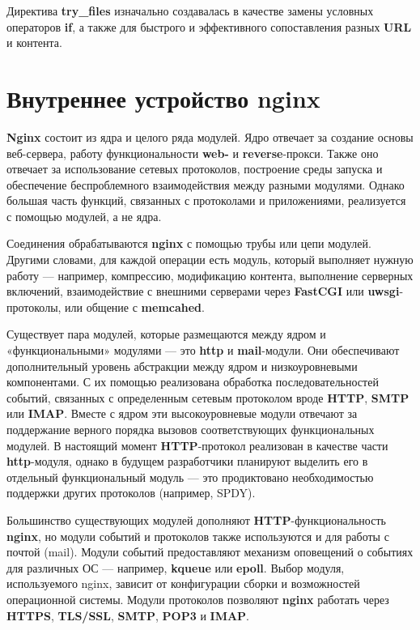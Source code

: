 \documentclass[14pt, a4paper]{article}
\begin{document}
Директива \textbf{try\_files} изначально создавалась в качестве замены условных операторов \textbf{if}, а также для 
быстрого и эффективного сопоставления разных \textbf{URL} и контента.

\section*{Внутреннее устройство nginx}
\textbf{Nginx} состоит из ядра и целого ряда модулей. Ядро отвечает за создание основы веб-сервера, 
работу функциональности \textbf{web-} и \textbf{reverse}-прокси. Также оно отвечает за использование сетевых 
протоколов, построение среды запуска и обеспечение беспроблемного взаимодействия между разными 
модулями. Однако большая часть функций, связанных с протоколами и приложениями, реализуется с 
помощью модулей, а не ядра.

Соединения обрабатываются \textbf{nginx} с помощью трубы или цепи модулей. Другими словами, для 
каждой операции есть модуль, который выполняет нужную работу — например, компрессию, 
модификацию контента, выполнение серверных включений, взаимодействие с внешними серверами 
через \textbf{FastCGI} или \textbf{uwsgi}-протоколы, или общение с \textbf{memcahed}.

Существует пара модулей, которые размещаются между ядром и «функциональными» модулями — это 
\textbf{http} и \textbf{mail}-модули. Они обеспечивают дополнительный уровень абстракции между ядром и 
низкоуровневыми компонентами. С их помощью реализована обработка последовательностей 
событий, связанных с определенным сетевым протоколом вроде \textbf{HTTP}, \textbf{SMTP} или \textbf{IMAP}. Вместе 
с ядром эти высокоуровневые модули отвечают за поддержание верного порядка вызовов 
соответствующих функциональных модулей. В настоящий момент \textbf{HTTP}-протокол реализован 
в качестве части \textbf{http}-модуля, однако в будущем разработчики планируют выделить его в 
отдельный функциональный модуль — это продиктовано необходимостью поддержки других протоколов (например, SPDY).

Большинство существующих модулей дополняют \linebreak\textbf{HTTP}-функциональность \textbf{nginx}, но модули событий и 
протоколов также используются и для работы с почтой (mail). Модули событий предоставляют 
механизм оповещений о событиях для различных ОС — например, \textbf{kqueue} или \textbf{epoll}. Выбор модуля, 
используемого nginx, зависит от конфигурации сборки и возможностей операционной системы. 
Модули протоколов позволяют \textbf{nginx} работать через \textbf{HTTPS}, \textbf{TLS/SSL}, 
\textbf{SMTP}, \textbf{POP3} и \textbf{IMAP}.
\end{document}
